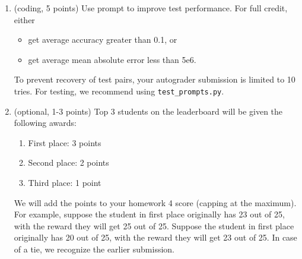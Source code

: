 \documentclass{article}
\theoremstyle{case}
\theoremstyle{definition}
\begin{document}
\begin{enumerate}[label=\alph*.]
    \item (coding, 5 points) Use prompt to improve test performance. For full credit, either
    \begin{itemize}
        \item get average accuracy greater than 0.1, or
        \item get average mean absolute error less than 5e6.
    \end{itemize}
    To prevent recovery of test pairs, your autograder submission is limited to 10 tries. For testing, we recommend using \texttt{test\_prompts.py}.
    \item (optional, 1-3 points)
    Top 3 students on the leaderboard will be given the following awards:
    \begin{enumerate}
        \item First place: 3 points
        \item Second place: 2 points
        \item Third place: 1 point
    \end{enumerate}
    We will add the points to your homework 4 score (capping at the maximum). For example, suppose the student in first place originally has 23 out of 25, with the reward they will get 25 out of 25. Suppose the student in first place originally has 20 out of 25, with the reward they will get 23 out of 25. In case of a tie, we recognize the earlier submission.
\end{enumerate}
\end{document}
